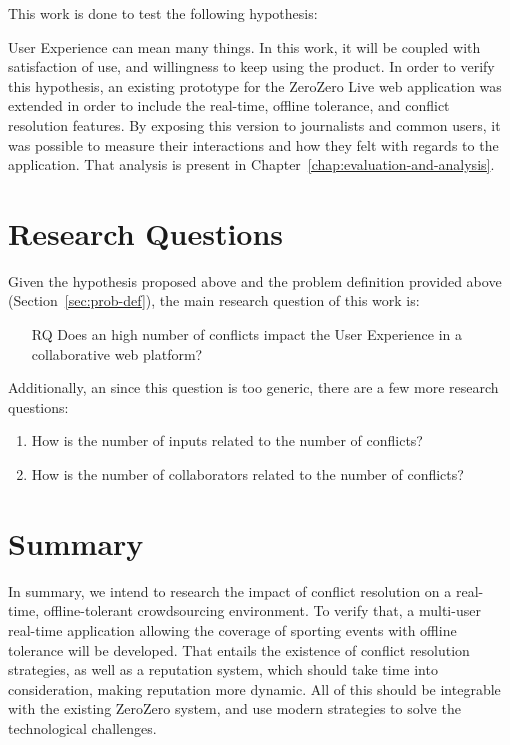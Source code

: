 This work is done to test the following hypothesis:

\begin{quote}
\end{quote}

User Experience can mean many things. In this work, it will be coupled with satisfaction of use, and willingness to keep using the product. In order to verify this hypothesis, an existing prototype for the ZeroZero Live web application was extended in order to include the real-time, offline tolerance, and conflict resolution features. By exposing this version to journalists and common users, it was possible to measure their interactions and how they felt with regards to the application. That analysis is present in Chapter~\ref{chap:evaluation-and-analysis}.

\section{Research Questions}\label{sec:research-questions}

Given the hypothesis proposed above and the problem definition provided above (Section~\ref{sec:prob-def}), the main research question of this work is:

\begin{enumerate}[leftmargin  = 3.25\parindent, align=left]
    \item[RQ] Does an high number of conflicts impact the User Experience in a collaborative web platform?
\end{enumerate}

Additionally, an since this question is too generic, there are a few more research questions: 
\begin{enumerate}[leftmargin  = 3.25\parindent, align=left, label=RQ\arabic*, start=1]
    \item How is the number of inputs related to the number of conflicts?
    \item How is the number of collaborators related to the number of conflicts?
\end{enumerate}

\section{Summary}

In summary, we intend to research the impact of conflict resolution on a real-time, offline-tolerant crowdsourcing environment. To verify that, a multi-user real-time application allowing the coverage of sporting events with offline tolerance will be developed. That entails the existence of conflict resolution strategies, as well as a reputation system, which should take time into consideration, making reputation more dynamic. All of this should be integrable with the existing ZeroZero system, and use modern strategies to solve the technological challenges.

